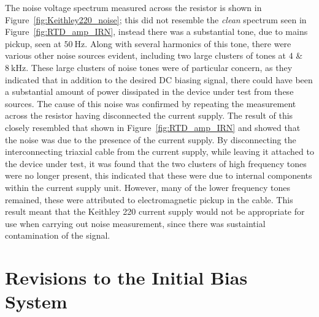 \par
The noise voltage spectrum measured across the resistor is shown in Figure~\ref{fig:Keithley220_noise}; this did not resemble the \textit{clean} spectrum seen in Figure~\ref{fig:RTD_amp_IRN}, instead there was a substantial tone, due to mains pickup, seen at $50~\mathrm{Hz}$. Along with several harmonics of this tone, there were various other noise sources evident, including two large clusters of tones at $4$ \& $8~\mathrm{kHz}$. These large clusters of noise tones were of particular concern, as they indicated that in addition to the desired DC biasing signal, there could have been a substantial amount of power dissipated in the device under test from these sources. The cause of this noise was confirmed by repeating the measurement across the resistor having disconnected the current supply. The result of this closely resembled that shown in Figure~\ref{fig:RTD_amp_IRN} and showed that the noise was due to the presence of the current supply. By disconnecting the interconnecting triaxial cable from the current supply, while leaving it attached to the device under test, it was found that the two clusters of high frequency tones were no longer present, this indicated that these were due to internal components within the current supply unit. However, many of the lower frequency tones remained, these were attributed to electromagnetic pickup in the cable. This result meant that the Keithley 220 current supply would not be appropriate for use when carrying out noise measurement, since there was sustaintial contamination of the signal.

\section{Revisions to the Initial Bias System} \label{sec:RTD_bias}
